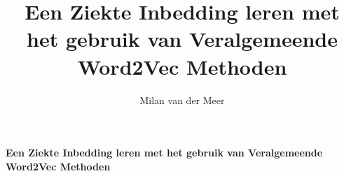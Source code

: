\documentclass[11pt, final, journal, twoside, a4paper]{IEEEtran}
\begin{document}
\graphicspath{ {Figures/} }
%
\title{Een Ziekte Inbedding leren met het gebruik van Veralgemeende Word2Vec Methoden}
%
%
%

\author{Milan van der Meer}%




\markboth{}%
{\textbf{Een Ziekte Inbedding leren met het gebruik van Veralgemeende Word2Vec Methoden}}
% 



\maketitle
\end{document}
